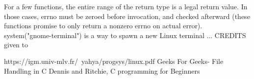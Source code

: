 \documentclass[10pt,a4paper]{report}
\begin{document}
For a few functions, the entire range of the return type is a legal return value. In those cases,
errno must be zeroed before invocation, and checked afterward (these functions promise to
only return a nonzero errno on actual error).
\\ [12pt]
 system("gnome-terminal")  is a way to spawn a new Linux terminal ... CREDITS given to\cite{gfg}

\begin{thebibliography} {}
 https://igm.univ-mlv.fr/~yahya/progsys/linux.pdf
 Geeks For Geeks- File Handling in C
Dennis and Ritchie, C programming for Beginners

\end{thebibliography} 
\end{document}
